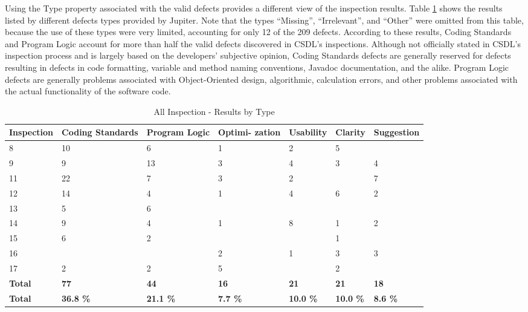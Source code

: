 Using the Type property associated with the valid defects provides a
different view of the inspection results. Table
\ref{tab:inspection-results-type} shows the results listed by different
defects types provided by Jupiter. Note that the types ``Missing'',
``Irrelevant'', and ``Other'' were omitted from this table, because the use
of these types were very limited, accounting for only 12 of the 209
defects. According to these results, Coding Standards and Program Logic
account for more than half the valid defects discovered in CSDL's
inspections. Although not officially stated in CSDL's inspection process
and is largely based on the developers' subjective opinion, Coding
Standards defects are generally reserved for defects resulting in defects
in code formatting, variable and method naming conventions, Javadoc
documentation, and the alike. Program Logic defects are generally problems
associated with Object-Oriented design, algorithmic, calculation errors,
and other problems associated with the actual functionality of the software
code.

\begin{table}[!h]
  \begin{center}
    \caption{All Inspection - Results by Type}
    \label{tab:inspection-results-type}
    \begin{tabular}{|p{2.0cm}|p{1.7cm}|p{1.5cm}|p{1.7cm}|p{1.4cm}|p{1.4cm}|p{1.5cm}|}  \hline   
\small{} {\bf Inspection} & \small{}{\bf Coding Standards} & 
\small{}{\bf Program Logic} & \small{} {\bf Optimi- zation} & 
\small{}{\bf Usability} & \small{} {\bf Clarity} & 
\small{} {\bf Suggestion} \\ \hline

 8 & 10& 6 & 1 & 2 & 5 &      \\ \hline
 9 & 9 & 13& 3 & 4 & 3 & 4    \\ \hline
11 & 22& 7 & 3 & 2 &   & 7    \\ \hline
12 & 14& 4 & 1 & 4 & 6 & 2    \\ \hline
13 & 5 & 6 &   &   &   &      \\ \hline
14 & 9 & 4 & 1 & 8 & 1 & 2    \\ \hline
15 & 6 & 2 &   &   & 1 &      \\ \hline
16 &   &   & 2 & 1 & 3 & 3    \\ \hline
17 & 2 & 2 & 5 &   & 2 &      \\ \hline

{\bf Total} & {\bf 77} & {\bf 44} & {\bf 16} & {\bf 21} & {\bf 21} & {\bf
  18} \\ \hline

{\bf Total} & {\bf 36.8 \%} & {\bf 21.1 \%} & {\bf 7.7 \%} & {\bf 10.0 \%} &
{\bf 10.0 \%} & {\bf 8.6 \%} \\ \hline

    \end{tabular}
  \end{center}
\end{table}

